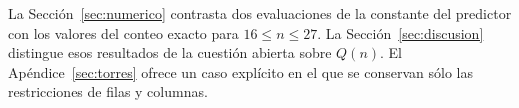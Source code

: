 La Sección~\ref{sec:numerico} contrasta dos evaluaciones de la constante del predictor con los
valores del conteo exacto para $16\le n\le27$. La Sección~\ref{sec:discusion} distingue esos resultados
de la cuestión abierta sobre $Q(n)$. El Apéndice~\ref{sec:torres} ofrece un caso explícito
en el que se conservan sólo las restricciones de filas y columnas.
